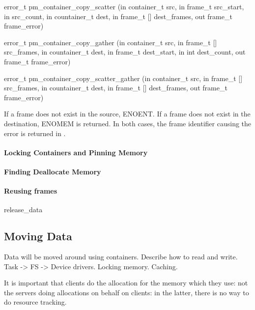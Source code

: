 \begin{code}
error\_t pm\_container\_copy\_scatter (in container\_t src, in frame\_t
src\_start, in src\_count, in countainer\_t dest, in frame\_t []
dest\_frames, out frame\_t frame\_error)
\end{code}

\begin{code}
error\_t pm\_container\_copy\_gather (in container\_t src, in frame\_t
[] src\_frames, in countainer\_t dest, in frame\_t dest\_start, in int
dest\_count, out frame\_t frame\_error)
\end{code}

\begin{code}
error\_t pm\_container\_copy\_scatter\_gather (in container\_t src, in
frame\_t [] src\_frames, in countainer\_t dest, in frame\_t []
dest\_frames, out frame\_t frame\_error)
\end{code}

If a frame does not exist in the source, ENOENT.  If a frame does not
exist in the destination, ENOMEM is returned.  In both cases, the
frame identifier causing the error is returned in
.

\paragraph{Locking Containers and Pinning Memory}

\paragraph{Finding Deallocate Memory}

\paragraph{Reusing frames}

release\_data

\subsection{Moving Data}

Data will be moved around using containers.  Describe how to read and
write.  Task -> FS -> Device drivers.  Locking memory.  Caching.

It is important that clients do the allocation for the memory which
they use: not the servers doing allocations on behalf on clients: in
the latter, there is no way to do resource tracking.

